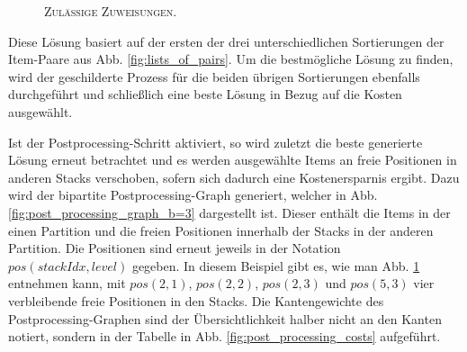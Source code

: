 \begin{figure}[H]
  \centering
    \caption{\textsc{Zulässige Zuweisungen.}}
    \label{fig:valid_solution}
\end{figure}

Diese Lösung basiert auf der ersten der drei unterschiedlichen Sortierungen der Item-Paare aus Abb. \ref{fig:lists_of_pairs}.
Um die bestmögliche Lösung zu finden, wird der geschilderte Prozess für die beiden übrigen Sortierungen
ebenfalls durchgeführt und schließlich eine beste Lösung in Bezug auf die Kosten ausgewählt.

Ist der Postprocessing-Schritt aktiviert, so wird zuletzt die beste generierte Lösung erneut betrachtet
und es werden ausgewählte Items an freie Positionen in anderen Stacks verschoben, sofern sich dadurch eine
Kostenersparnis ergibt.
Dazu wird der bipartite Postprocessing-Graph generiert, welcher in Abb. \ref{fig:post_processing_graph_b=3} dargestellt ist.
Dieser enthält die Items in der einen Partition und die freien Positionen innerhalb der Stacks in der anderen Partition.
Die Positionen sind erneut jeweils in der Notation $pos(stackIdx, level)$ gegeben. In diesem Beispiel gibt es,
wie man Abb. \ref{fig:valid_solution} entnehmen kann, mit $pos(2, 1)$, $pos(2, 2)$, $pos(2, 3)$ und $pos(5, 3)$
vier verbleibende freie Positionen in den Stacks. Die Kantengewichte des Postprocessing-Graphen sind der Übersichtlichkeit halber nicht an den Kanten notiert, sondern in der Tabelle in Abb. \ref{fig:post_processing_costs} aufgeführt.

